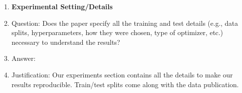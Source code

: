\begin{enumerate}
\item {\bf Experimental Setting/Details}
    \item[] Question: Does the paper specify all the training and test details (e.g., data splits, hyperparameters, how they were chosen, type of optimizer, etc.) necessary to understand the results?
    \item[] Answer: \answerYes{} %
    \item[] Justification: Our experiments section contains all the details to make our results reproducible. Train/test splits come along with the data publication. 


\end{enumerate}
